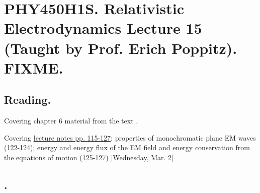 
%

\chapter{PHY450H1S.  Relativistic Electrodynamics Lecture 15 (Taught by Prof. Erich Poppitz).  FIXME.}
\label{chap:relativisticElectrodynamicsL16}
{}
\date{Mar 2, 2011}

\beginArtNoToc

\section{Reading.}

Covering chapter 6 material from the text \cite{landau1980classical}.

Covering \href{http://www.physics.utoronto.ca/~poppitz/e-poppitz/PHY450_files/RelEMpp115-127.pdf}{lecture notes pp. 115-127}: properties of monochromatic plane EM waves (122-124); energy and energy flux of the EM field and energy conservation from the equations of motion (125-127)  [Wednesday, Mar. 2]

\section{.}

\EndArticle
